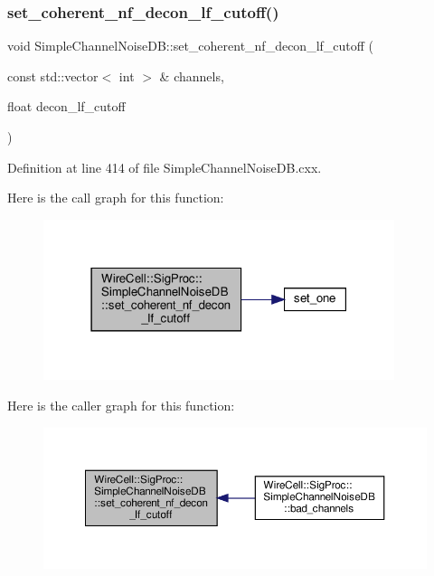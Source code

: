 \subsubsection{\texorpdfstring{set\+\_\+coherent\+\_\+nf\+\_\+decon\+\_\+lf\+\_\+cutoff()}{set\_coherent\_nf\_decon\_lf\_cutoff()}}
{\footnotesize\ttfamily void Simple\+Channel\+Noise\+D\+B\+::set\+\_\+coherent\+\_\+nf\+\_\+decon\+\_\+lf\+\_\+cutoff (\begin{DoxyParamCaption}\item[{const std\+::vector$<$ int $>$ \&}]{channels,  }\item[{float}]{decon\+\_\+lf\+\_\+cutoff }\end{DoxyParamCaption})}



Definition at line 414 of file Simple\+Channel\+Noise\+D\+B.\+cxx.

Here is the call graph for this function\+:
\nopagebreak
\begin{figure}[H]
\begin{center}
\leavevmode
\includegraphics[width=291pt]{class_wire_cell_1_1_sig_proc_1_1_simple_channel_noise_d_b_aa8e97e9e59e9a91d23b572acd6eec29b_cgraph}
\end{center}
\end{figure}
Here is the caller graph for this function\+:
\nopagebreak
\begin{figure}[H]
\begin{center}
\leavevmode
\includegraphics[width=350pt]{class_wire_cell_1_1_sig_proc_1_1_simple_channel_noise_d_b_aa8e97e9e59e9a91d23b572acd6eec29b_icgraph}
\end{center}
\end{figure}
\mbox{\label{class_wire_cell_1_1_sig_proc_1_1_simple_channel_noise_d_b_a44e68d8302a63ca34e82c9f6dfb5b209}} 
